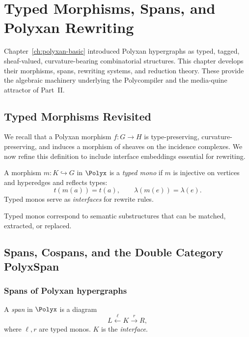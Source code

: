 \chapter{Typed Morphisms, Spans, and Polyxan Rewriting}
\label{ch:polyxan-rewriting}

Chapter~\ref{ch:polyxan-basic} introduced Polyxan hypergraphs as typed,
tagged, sheaf-valued, curvature-bearing combinatorial structures.  This chapter
develops their morphisms, spans, rewriting systems, and reduction theory.
These provide the algebraic machinery underlying the Polycompiler and the
media-quine attractor of Part~II.

\section{Typed Morphisms Revisited}

We recall that a Polyxan morphism $f : G \to H$ is type-preserving, curvature-preserving, and induces a morphism of sheaves on the incidence complexes.  We now refine this definition to include interface embeddings essential for rewriting.

\begin{definition}
A morphism $m : K \hookrightarrow G$ in $\Polyx$ is a \emph{typed mono} if
$m$ is injective on vertices and hyperedges and reflects types:
\[
t(m(a)) = t(a), \qquad \lambda(m(e)) = \lambda(e).
\]
Typed monos serve as \emph{interfaces} for rewrite rules.
\end{definition}

Typed monos correspond to semantic substructures that can be matched,
extracted, or replaced.

\section{Spans, Cospans, and the Double Category PolyxSpan}

\subsection{Spans of Polyxan hypergraphs}

\begin{definition}[Span]
A \emph{span} in $\Polyx$ is a diagram
\[
L \xleftarrow{\;\ell\;} K \xrightarrow{\;r\;} R,
\]
where $\ell,r$ are typed monos.  $K$ is the \emph{interface}.
\end{definition}

